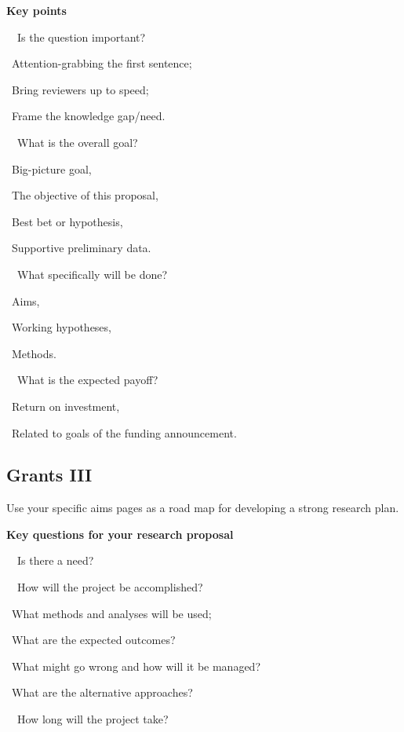 \documentclass[a4paper, 12pt]{article}
\begin{document}
\textbf{Key points}
\par\ \textbullet\ Is the question important?
\par\quad\textopenbullet\ Attention-grabbing the first sentence;
\par\quad\textopenbullet\ Bring reviewers up to speed;
\par\quad\textopenbullet\ Frame the knowledge gap/need.
\par\ \textbullet\ What is the overall goal?
\par\quad\textopenbullet\ Big-picture goal,
\par\quad\textopenbullet\ The objective of this proposal,
\par\quad\textopenbullet\ Best bet or hypothesis,
\par\quad\textopenbullet\ Supportive preliminary data.
\par\ \textbullet\ What specifically will be done?
\par\quad\textopenbullet\ Aims,
\par\quad\textopenbullet\ Working hypotheses,
\par\quad\textopenbullet\ Methods.
\par\ \textbullet\ What is the expected payoff?
\par\quad\textopenbullet\ Return on investment,
\par\quad\textopenbullet\ Related to goals of the funding announcement.

\newpage\subsection{Grants III}

Use your specific aims pages as a road map for developing a strong research plan.

\textbf{Key questions for your research proposal}
\par\ \textbullet\ Is there a need?
\par\ \textbullet\ How will the project be accomplished?
\par\quad\textopenbullet\ What methods and analyses will be used;
\par\quad\textopenbullet\ What are the expected outcomes?
\par\quad\textopenbullet\ What might go wrong and how will it be managed?
\par\quad\textopenbullet\ What are the alternative approaches?
\par\ \textbullet\ How long will the project take?
\end{document}
